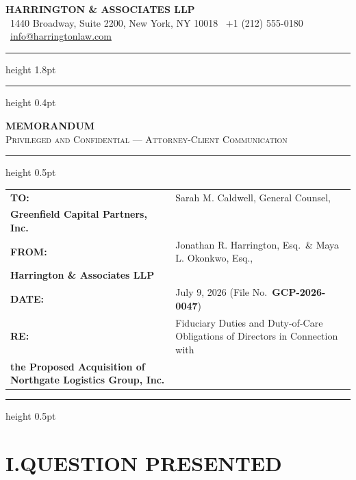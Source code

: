 \documentclass[11pt,letterpaper]{article}
\makeatletter
\newcommand{\memoheader}[4]{%
  \begin{tabularx}{\linewidth}{%
    @{}>{\color{keycolor}\bfseries\small}l@{\hspace{10mm}}>{\small\raggedright\arraybackslash}X@{}%
  }%
    TO:   & #1 \\[3pt]
    FROM: & #2 \\[3pt]
    DATE: & #3 \\[3pt]
    RE:   & #4 \\
  \end{tabularx}%
}
\makeatother
\begin{document}
\color{subtle}

\begin{center}
  {\large\bfseries\color{accent}HARRINGTON \& ASSOCIATES LLP}\\[2pt]
  {\small\color{subtle}
    \ 1440 Broadway, Suite 2200, New York, NY 10018\quad
    \ +1 (212) 555-0180\quad
    \ \href{mailto:info@harringtonlaw.com}{info@harringtonlaw.com}%
  }
\end{center}

\vspace{6pt}
{\color{rule}\hrule height 1.8pt}
\vspace{3pt}
{\color{rule}\hrule height 0.4pt}
\vspace{14pt}

\begin{center}
  {\large\bfseries\color{accent}MEMORANDUM}\\[2pt]
  {\small\color{subtle}\textsc{Privileged and Confidential — Attorney-Client Communication}}
\end{center}

\vspace{10pt}
{\color{rule}\hrule height 0.5pt}
\vspace{8pt}

\memoheader{%
  Sarah M. Caldwell, General Counsel,\\
  \hspace*{0pt}Greenfield Capital Partners, Inc.%
}{%
  Jonathan R. Harrington, Esq.\ \& Maya L. Okonkwo, Esq.,\\
  \hspace*{0pt}Harrington \& Associates LLP%
}{%
  July 9, 2026 \quad (File No.\ \textbf{GCP-2026-0047})%
}{%
  Fiduciary Duties and Duty-of-Care Obligations of Directors in Connection with\\
  \hspace*{0pt}the Proposed Acquisition of Northgate Logistics Group, Inc.%
}

\vspace{8pt}
{\color{rule}\hrule height 0.5pt}
\vspace{12pt}

\section*{I.\quad QUESTION PRESENTED}
\end{document}
